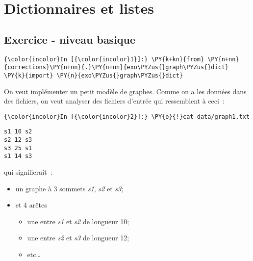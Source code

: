     
    
    
    

    

    \hypertarget{dictionnaires-et-listes}{%
\section{Dictionnaires et listes}\label{dictionnaires-et-listes}}

    \hypertarget{exercice---niveau-basique}{%
\subsection{Exercice - niveau basique}\label{exercice---niveau-basique}}

    \begin{Verbatim}[commandchars=\\\{\}]
{\color{incolor}In [{\color{incolor}1}]:} \PY{k+kn}{from} \PY{n+nn}{corrections}\PY{n+nn}{.}\PY{n+nn}{exo\PYZus{}graph\PYZus{}dict} \PY{k}{import} \PY{n}{exo\PYZus{}graph\PYZus{}dict}
\end{Verbatim}


    On veut implémenter un petit modèle de graphes. Comme on a les données
dans des fichiers, on veut analyser des fichiers d'entrée qui
ressemblent à ceci~:

    \begin{Verbatim}[commandchars=\\\{\}]
{\color{incolor}In [{\color{incolor}2}]:} \PY{o}{!}cat data/graph1.txt
\end{Verbatim}


    \begin{Verbatim}[commandchars=\\\{\}]
s1 10 s2
s2 12 s3
s3 25 s1
s1 14 s3

    \end{Verbatim}

    qui signifierait~:

\begin{itemize}
\tightlist
\item
  un graphe à 3 sommets \emph{s1}, \emph{s2} et \emph{s3};
\item
  et 4 arêtes

  \begin{itemize}
  \tightlist
  \item
    une entre \emph{s1} et \emph{s2} de longueur 10;
  \item
    une entre \emph{s2} et \emph{s3} de longueur 12;
  \item
    etc\ldots{}
  \end{itemize}
\end{itemize}

